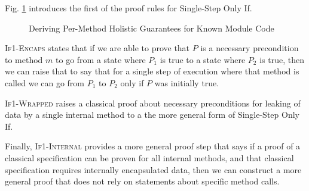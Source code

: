 Fig. \ref{f:classical->singlestep} introduces the first of the proof 
rules for Single-Step Only If.
\begin{figure}[t]
\footnotesize
{}
\caption{Deriving Per-Method Holistic Guarantees for Known Module Code}
\label{f:classical->singlestep}
\end{figure}

\textsc{If1-Encaps} states that if we are able to prove that $P$ is 
a necessary precondition to method $m$ to go from a state where 
$P_1$ is true to a state where $P_2$ is true, then we can raise 
that to say that for a single step of execution where that method 
is called we can go from $P_1$ to $P_2$ only if $P$ was initially true.

\textsc{If1-Wrapped} raises a classical proof about necessary preconditions 
for leaking of data by a single internal method to a the more general form of 
Single-Step Only If.

Finally, \textsc{If1-Internal} provides a more general proof step that says
if a proof of a classical specification can be proven for all internal 
methods, and that classical specification requires internally encapsulated
data, then we can construct a more general proof that does not rely on
statements about specific method calls.

